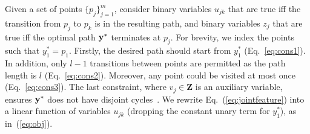 Given a set of points $\{p_j\}_{j=1}^m$,
consider binary variables $u_{jk}$ that are true iff
the transition from $p_j$ to $p_k$ is in the resulting path,
and binary variables $z_j$ that are true iff
the optimal path $\mathbf{y}^*$ terminates at $p_j$.
For brevity, we index the points such that $y_1^* = p_1$.
Firstly, the desired path should start from $y_1^*$ (Eq.~\ref{eq:cons1}).
In addition, only $l\!-\!1$ transitions between points are permitted as the path length is $l$ (Eq.~\ref{eq:cons2}).
Moreover, any point could be visited at most once (Eq.~\ref{eq:cons3}).
The last constraint, where $v_j \in \mathbf{Z}$ is an auxiliary variable,
ensures $\mathbf{y}^*$ does not have disjoint cycles~\cite{Miller:1960}.
We rewrite Eq.~(\ref{eq:jointfeature}) into a linear function of variables $u_{jk}$
(dropping the constant unary term for $y_1^*$), as %
in~(\ref{eq:obj}).
